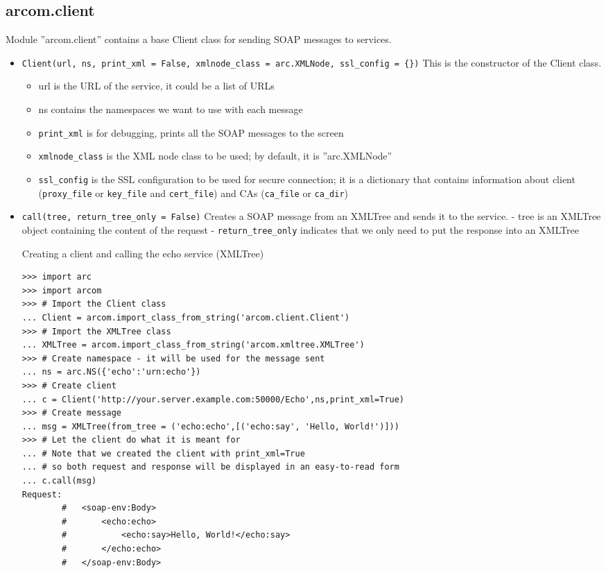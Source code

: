 \documentclass{article}
\begin{document}
\subsection{arcom.client}
\label{aclient}
Module ''arcom.client'' contains a base Client class for sending SOAP messages to services.
\begin{flushleft}
\begin{itemize}
  \item{ \verb$Client(url, ns, print_xml = False, xmlnode_class = arc.XMLNode, ssl_config = {})$\newline
  This is the constructor of the Client class.
  \begin{itemize}
    \item{url is the URL of the service, it could be a list of URLs}
    \item{ns contains the namespaces we want to use with each message}
    \item{\verb$print_xml$ is for debugging, prints all the SOAP messages to the screen}
    \item{\verb$xmlnode_class$ is the XML node class to be used; by default, it is ''arc.XMLNode''}
    \item{\verb$ssl_config$ is the SSL configuration to be used for secure connection; it is a dictionary that contains information about client (\verb$proxy_file$ or \verb$key_file$ and \verb$cert_file$) and CAs (\verb$ca_file$ or \verb$ca_dir$)}
  \end{itemize}
  }
\end{itemize}
\begin{itemize}
  \item{ \verb$call(tree, return_tree_only = False)$\newline
    Creates a SOAP message from an XMLTree and sends it to the service. \newline
    - tree is an XMLTree object containing the content of the request \newline
    - \verb$return_tree_only$ indicates that we only need to put the response into an XMLTree
    \begin{example}
      \caption{Creating a client and calling the echo service (XMLTree)}\label{clientex1}
\begin{verbatim}
>>> import arc
>>> import arcom
>>> # Import the Client class
... Client = arcom.import_class_from_string('arcom.client.Client')
>>> # Import the XMLTree class
... XMLTree = arcom.import_class_from_string('arcom.xmltree.XMLTree')
>>> # Create namespace - it will be used for the message sent
... ns = arc.NS({'echo':'urn:echo'})
>>> # Create client
... c = Client('http://your.server.example.com:50000/Echo',ns,print_xml=True)
>>> # Create message
... msg = XMLTree(from_tree = ('echo:echo',[('echo:say', 'Hello, World!')]))
>>> # Let the client do what it is meant for
... # Note that we created the client with print_xml=True
... # so both request and response will be displayed in an easy-to-read form
... c.call(msg)
Request:
        #   <soap-env:Body>
        #       <echo:echo>
        #           <echo:say>Hello, World!</echo:say>
        #       </echo:echo>
        #   </soap-env:Body>


\end{verbatim}
\end{example}}
\end{itemize}
\end{flushleft}
\end{document}
